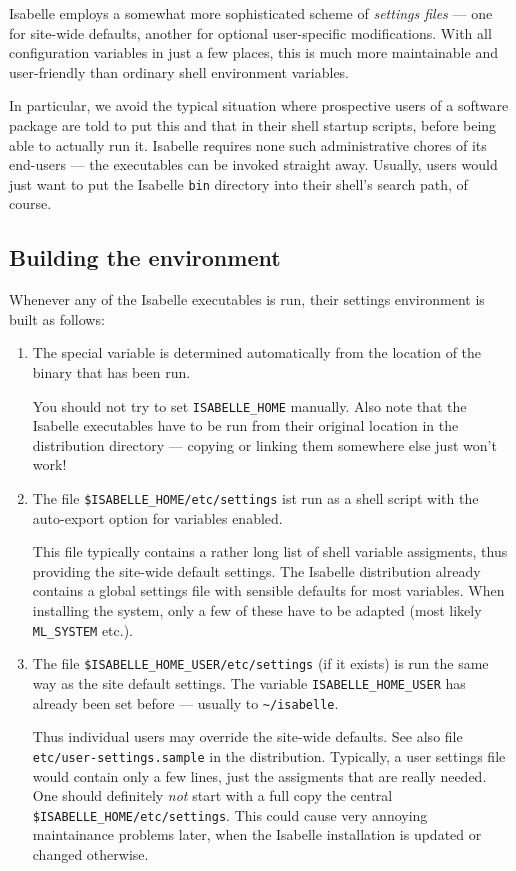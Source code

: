 Isabelle employs a somewhat more sophisticated scheme of
\emph{settings files} --- one for site-wide defaults, another for
optional user-specific modifications.  With all configuration
variables in just a few places, this is much more maintainable and
user-friendly than ordinary shell environment variables.

In particular, we avoid the typical situation where prospective users
of a software package are told to put this and that in their shell
startup scripts, before being able to actually run it. Isabelle
requires none such administrative chores of its end-users --- the
executables can be invoked straight away. Usually, users would just
want to put the Isabelle \texttt{bin} directory into their shell's
search path, of course.


\subsection{Building the environment}

Whenever any of the Isabelle executables is run, their settings
environment is built as follows:

\begin{enumerate}
\item The special variable  is determined
  automatically from the location of the binary that has been run.

  You should not try to set \texttt{ISABELLE_HOME} manually. Also note
  that the Isabelle executables have to be run from their original
  location in the distribution directory --- copying or linking them
  somewhere else just won't work!

\item The file \texttt{\$ISABELLE_HOME/etc/settings} ist run as a
  shell script with the auto-export option for variables enabled.

  This file typically contains a rather long list of shell variable
  assigments, thus providing the site-wide default settings.  The
  Isabelle distribution already contains a global settings file with
  sensible defaults for most variables. When installing the system,
  only a few of these have to be adapted (most likely
  \texttt{ML_SYSTEM} etc.).

\item The file \texttt{\$ISABELLE_HOME_USER/etc/settings} (if it
  exists) is run the same way as the site default settings. The
  variable \texttt{ISABELLE_HOME_USER} has already been set before ---
  usually to \texttt{\~\relax/isabelle}.

  Thus individual users may override the site-wide defaults. See also
  file \texttt{etc/user-settings.sample} in the distribution.
  Typically, a user settings file would contain only a few lines, just
  the assigments that are really needed.  One should definitely
  \emph{not} start with a full copy the central
  \texttt{\$ISABELLE_HOME/etc/settings}. This could cause very
  annoying maintainance problems later, when the Isabelle installation
  is updated or changed otherwise.

\end{enumerate}

